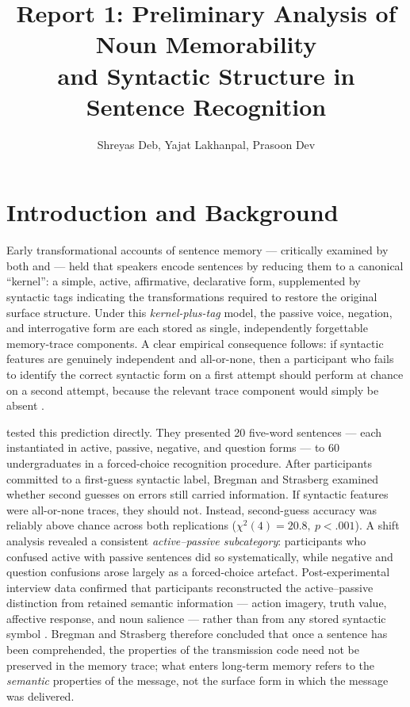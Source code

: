 \documentclass[12pt, a4paper]{article}
\title{\textbf{Report 1: Preliminary Analysis of Noun Memorability\\
and Syntactic Structure in Sentence Recognition}}
\author{Shreyas Deb, Yajat Lakhanpal, Prasoon Dev}
\begin{document}
\maketitle

\section{Introduction and Background}

Early transformational accounts of sentence memory — critically examined by
both \citet{bregman1968} and \citet{james1973} — held that speakers encode
sentences by reducing them to a canonical ``kernel'': a simple, active,
affirmative, declarative form, supplemented by syntactic tags indicating the
transformations required to restore the original surface structure. Under this
\textit{kernel-plus-tag} model, the passive voice, negation, and interrogative
form are each stored as single, independently forgettable memory-trace
components. A clear empirical consequence follows: if syntactic features are
genuinely independent and all-or-none, then a participant who fails to identify
the correct syntactic form on a first attempt should perform at chance on a
second attempt, because the relevant trace component would simply be absent
\citep{bregman1968}.

\citet{bregman1968} tested this prediction directly. They presented 20 five-word
sentences — each instantiated in active, passive, negative, and question forms —
to 60 undergraduates in a forced-choice recognition procedure. After participants
committed to a first-guess syntactic label, Bregman and Strasberg examined
whether second guesses on errors still carried information. If syntactic features
were all-or-none traces, they should not. Instead, second-guess accuracy was
reliably above chance across both replications (\(\chi^2(4) = 20.8,\ p < .001\)).
A shift analysis revealed a consistent \textit{active--passive subcategory}:
participants who confused active with passive sentences did so systematically,
while negative and question confusions arose largely as a forced-choice artefact.
Post-experimental interview data confirmed that participants reconstructed the
active--passive distinction from retained semantic information — action imagery,
truth value, affective response, and noun salience — rather than from any stored
syntactic symbol \citep{bregman1968}. Bregman and Strasberg therefore concluded
that once a sentence has been comprehended, the properties of the transmission
code need not be preserved in the memory trace; what enters long-term memory
refers to the \textit{semantic} properties of the message, not the surface form
in which the message was delivered.
\end{document}
